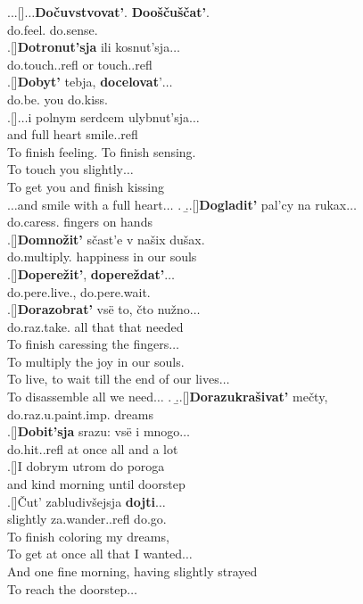 \ex.\label{ex:poem}\a.\label{poem:a}\ag.[]$\ldots$\textbf{Do\v{c}uvstvovat'}. \textbf{Doo\v{s}\v{c}u\v{s}\v{c}at'}.\\
do.feel. do.sense.\\
\bg.[]\textbf{Dotronut'sja} ili kosnut'sja$\ldots$\\
do.touch..refl or touch..refl\\
\bg.[]\textbf{Dobyt'} tebja, \textbf{docelovat}'$\ldots$\\
do.be. you do.kiss.\\
\bg.[]$\ldots$i polnym serdcem ulybnut'sja$\ldots$\\
and full heart smile..refl\\
\trans To finish feeling. To finish sensing.\\
To touch you slightly$\ldots$\\
To get you and finish kissing\\
$\ldots$and smile with a full heart$\ldots$
\z.
\b.\label{poem:b}\ag.[]\textbf{Dogladit'} pal'cy na rukax$\ldots$\\
do.caress. fingers on hands\\
\bg.[]\textbf{Domno\v{z}it'} s\v{c}ast'e v na\v{s}ix du\v{s}ax.\\
do.multiply. happiness in our souls\\
\bg.[]\textbf{Dopere\v{z}it'}, \textbf{dopere\v{z}dat'}$\ldots$\\
do.pere.live., do.pere.wait.\\
\bg.[]\textbf{Dorazobrat'} vs\"{e} to, \v{c}to nu\v{z}no$\ldots$ \\
do.raz.take. all that that needed\\
\trans To finish caressing the fingers$\ldots$\\
To multiply the joy in our souls.\\
To live,  to wait till the end of our lives$\ldots$\\
To disassemble all we need$\ldots$
\z.
\b.\label{poem:c}\ag.[]\textbf{Dorazukra\v{s}ivat'} me\v{c}ty,\\
do.raz.u.paint.imp. dreams\\
\bg.[]\textbf{Dobit'sja} srazu: vs\"{e} i mnogo$\ldots$\\
do.hit..refl {at once} all and {a lot}\\
\bg.[]I dobrym utrom do poroga\\
and kind morning until doorstep\\
\bg.[]\v{C}ut' zabludiv\v{s}ejsja \textbf{dojti}$\ldots$\\
slightly za.wander..refl do.go.\\
\trans To finish coloring my dreams,\\
To get at once all that I wanted$\ldots$\\
And one fine morning, having slightly strayed\\
To reach the doorstep$\ldots$\\

